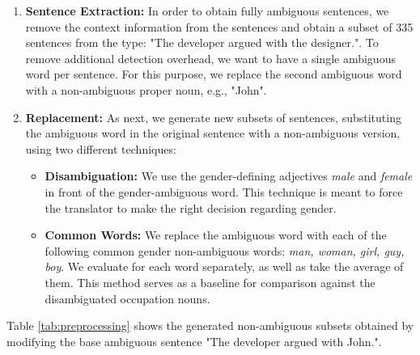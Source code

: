\begin{enumerate}
  \item \textbf{Sentence Extraction:}  
  In order to obtain fully ambiguous sentences, we remove the context information from the sentences and obtain a subset of 335 sentences from the type: "The developer argued with the designer.".
  To remove additional detection overhead, we want to have a single ambiguous word per sentence. For this purpose, we replace the second ambiguous word with a non-ambiguous proper noun, e.g., "John". 
  \item \textbf{Replacement:} As next, we generate new subsets of sentences, substituting the ambiguous word in the original sentence with a non-ambiguous version, using two different techniques:
  \begin{itemize}
      \item \textbf{Disambiguation:} We use the gender-defining adjectives \textit{male} and \textit{female} in front of the gender-ambiguous word. This technique is meant to force the translator to make the right decision regarding gender. %
      \item \textbf{Common Words:} We replace the ambiguous word with each of the following common gender non-ambiguous words: \textit{man, woman, girl, guy, boy}. We evaluate for each word separately, as well as take the average of them. This method serves as a baseline for comparison against the disambiguated occupation nouns.
  \end{itemize}
\end{enumerate}

Table \ref{tab:preprocessing} shows the generated non-ambiguous subsets obtained by modifying the base ambiguous sentence "The developer argued with John.".

